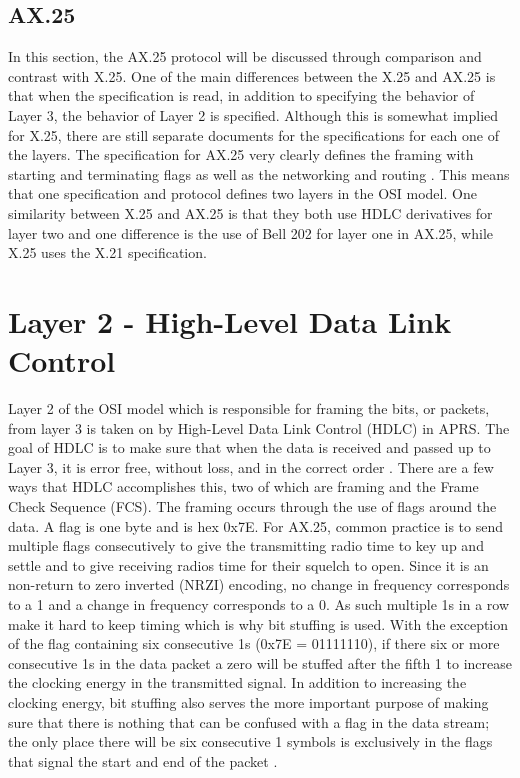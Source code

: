 \subsection{AX.25}
In this section, the AX.25 protocol will be discussed through comparison and contrast with X.25. One of the main differences between the X.25 and AX.25 is that when the specification is read, in addition to specifying the behavior of Layer 3, the behavior of Layer 2 is specified. Although this is somewhat implied for X.25, there are still separate documents for the specifications for each one of the layers. The specification for AX.25 very clearly defines the framing with starting and terminating flags as well as the networking and routing \cite{Beech1998}. This means that one specification and protocol defines two layers in the OSI model. One similarity between X.25 and AX.25 is that they both use HDLC derivatives for layer two and one difference is the use of Bell 202 for layer one in AX.25, while X.25 uses the X.21 specification.

\section{Layer 2 - High-Level Data Link Control}
Layer 2 of the OSI model which is responsible for framing the bits, or packets, from layer 3 is taken on by High-Level Data Link Control (HDLC) in APRS. The goal of HDLC is to make sure that when the data is received and passed up to Layer 3, it is error free, without loss, and in the correct order \cite{Javvin2006}. There are a few ways that HDLC accomplishes this, two of which are framing and the Frame Check Sequence (FCS). The framing occurs through the use of flags around the data. A flag is one byte and is hex 0x7E. For AX.25, common practice is to send multiple flags consecutively to give the transmitting radio time to key up and settle and to give receiving radios time for their squelch to open. Since it is an non-return to zero inverted (NRZI) encoding, no change in frequency corresponds to a 1 and a change in frequency corresponds to a 0. As such multiple 1s in a row make it hard to keep timing which is why bit stuffing is used. With the exception of the flag containing six consecutive 1s (0x7E = 01111110), if there six or more consecutive 1s in the data packet a zero will be stuffed after the fifth 1 to increase the clocking energy in the transmitted signal. In addition to increasing the clocking energy, bit stuffing also serves the more important purpose of making sure that there is nothing that can be confused with a flag in the data stream; the only place there will be six consecutive 1 symbols is exclusively in the flags that signal the start and end of the packet \cite{Horzepa1992}.

